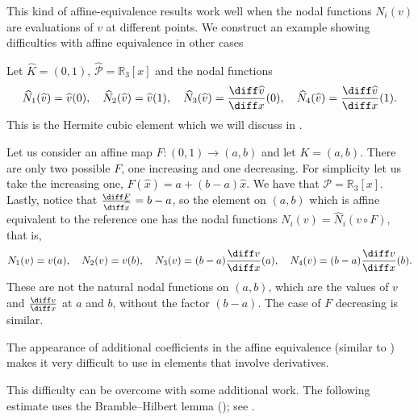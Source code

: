 This kind of affine-equivalence results work well when the nodal functions $N_i(v)$ are evaluations of $v$ at different points. We construct an example showing difficulties with affine equivalence in other cases
\begin{example}
    \label{ex:FEM affine equivalence Hermite cubics}
    Let $\widehat K = (0,1)$, $\widehat{\mathcal P} = \mathbb R_3[x]$ and the nodal functions
    \begin{equation*}
        \widehat N_1(\widehat v) = \widehat v(0),
        \quad \widehat N_2(\widehat v) = \widehat v(1),
        \quad \widehat N_3(\widehat v) = \frac{\diff \widehat v}{\diff x}(0),
        \quad \widehat N_4(\widehat v) = \frac{\diff \widehat v}{\diff x}(1).
    \end{equation*}
    This is the Hermite cubic element which we will discuss in .

    Let us consider an affine map $F: (0,1) \to (a,b)$
    and let $K = (a,b)$.
    There are only two possible $F$, one increasing and one decreasing. For simplicity let us take the increasing one, $F(\widehat x) = a + (b-a)\widehat x$.
    We have that $\mathcal P = \mathbb R_3[x]$. Lastly, notice that $\frac{\diff F}{\diff \widehat x} = b-a$, so the element on $(a,b)$ which is affine equivalent to the reference one has the nodal functions $N_i (v) = \widehat N_i (v \circ F)$, that is,
    \begin{equation*}
        N_1(v) = v(a),
        \quad N_2(v) = v(b),
        \quad N_3(v) = (b-a)\frac{\diff v}{\diff x}(a) ,
        \quad N_4(v) = (b-a)\frac{\diff v}{\diff x}(b).
    \end{equation*}
    These are not the natural nodal functions on $(a,b)$, which are the values of $v$ and $\frac{\diff v}{\diff x}$ at $a$ and $b$, without the factor $(b-a)$.
    The case of $F$ decreasing is similar.
\end{example}
\begin{remark}
    \label{rem:FEM affine equivalence element with derivatives}
    The appearance of additional coefficients in the affine equivalence (similar to ) makes it very difficult to use  in elements that involve derivatives.
\end{remark}

This difficulty can be overcome with some additional work.
The following estimate uses the Bramble--Hilbert lemma (); see \cite[Section 3.2]{Suli}.

